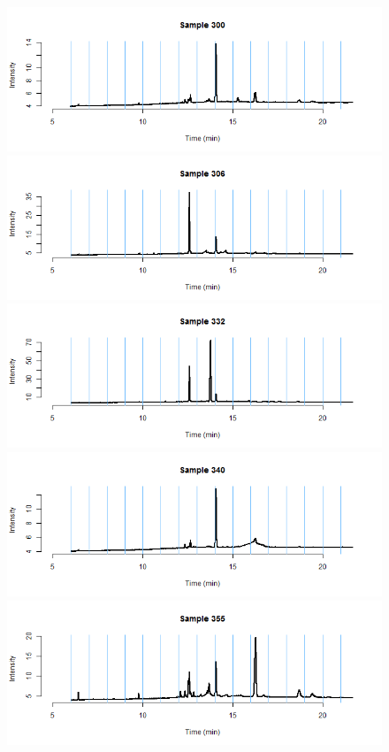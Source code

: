 \documentclass[11pt]{article}
\theoremstyle{plain}
\theoremstyle{definition}
\begin{document}
\begin{figure}[H]
\begin{center}
\includegraphics[trim ={3.5cm 2.7cm 2cm 2cm},scale=.6, clip=true]{BinPlotDMC_29.png}
\includegraphics[trim ={3.5cm 2.7cm 2cm 2cm},scale=.6, clip=true]{BinPlotDMC_30.png}
\includegraphics[trim ={3.5cm 2.7cm 2cm 2cm},scale=.6, clip=true]{BinPlotDMC_31.png}
\includegraphics[trim ={3.5cm 2.7cm 2cm 2cm},scale=.6, clip=true]{BinPlotDMC_32.png}
\includegraphics[trim ={3.5cm 2.7cm 2cm 2cm},scale=.6, clip=true]{BinPlotDMC_33.png}

\end{center}
\end{figure}
\end{document}
